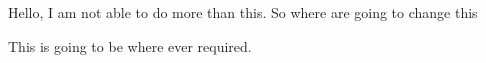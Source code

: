 \documentclass{article}
\begin{document}
Hello, I am not able to do more than this. So where are going to change this

This is going to be where ever required.
\end{document}
